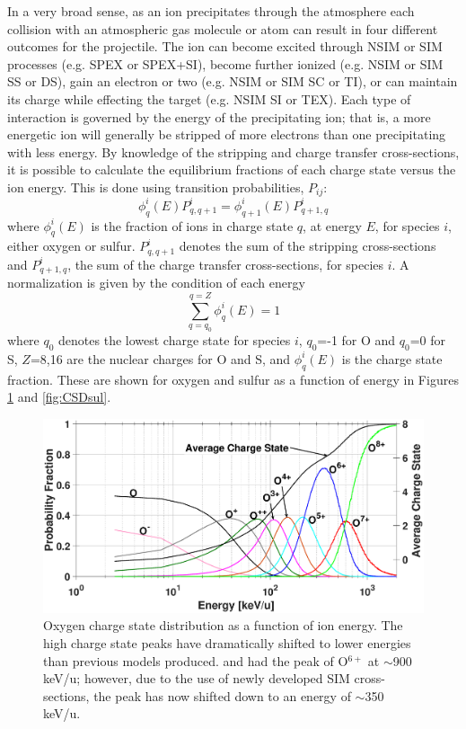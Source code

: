 \documentclass[draft]{agujournal2018}
\begin{document}
In a very broad sense, as an ion precipitates through the atmosphere each collision with an atmospheric gas molecule or atom can result in four different outcomes for the projectile.
The ion can become excited through NSIM or SIM processes (e.g. SPEX or SPEX+SI), become further ionized (e.g. NSIM or SIM SS or DS), gain an electron or two (e.g. NSIM or SIM SC or TI), or can maintain its charge while effecting the target (e.g. NSIM SI or TEX).
Each type of interaction is governed by the energy of the precipitating ion; that is, a more energetic ion will generally be stripped of more electrons than one precipitating with less energy.
By knowledge of the stripping and charge transfer cross-sections, it is possible to calculate the equilibrium fractions of each charge state versus the ion energy.
This is done using transition probabilities, $P_{ij}$:
\begin{equation}
    \phi_{q}^{i}(E) P^i_{q,q+1}=\phi_{q+1}^{i}(E) P^i_{q+1,q}
    \label{eqn:EqProb}
\end{equation}
where $\phi_q^i(E)$ is the fraction of ions in charge state $q$, at energy $E$, for species $i$, either oxygen or sulfur.
$P^i_{q,q+1}$ denotes the sum of the stripping cross-sections and $P^i_{q+1,q}$, the sum of the charge transfer cross-sections, for species $i$.
A normalization is given by the condition of each energy
\begin{equation}
    \sum_{q=q_0}^{q=Z}\phi^i_q(E)=1
    \label{eqn:EqProbNorm}
\end{equation}
where $q_0$ denotes the lowest charge state for species $i$, $q_0$=-1 for O and $q_0$=0 for S, $Z$=8,16 are the nuclear charges for O and S, and $\phi_q^i(E)$ is the charge state fraction.
These are shown for oxygen and sulfur as a function of energy in Figures \ref{fig:CSDoxy} and \ref{fig:CSDsul}.

\begin{figure}
    \centering
    \includegraphics[width=\textwidth]{Figures/CSDoxy.eps}
    \caption{Oxygen charge state distribution as a function of ion energy. The high charge state peaks have dramatically shifted to lower energies than previous models produced. \citet{houston2018} and \citet{ozak2010} had the peak of O$^{6+}$ at $\sim$900 keV/u; however, due to the use of newly developed SIM cross-sections, the peak has now shifted down to an energy of $\sim$350 keV/u.}
    \label{fig:CSDoxy}
\end{figure}
\end{document}
